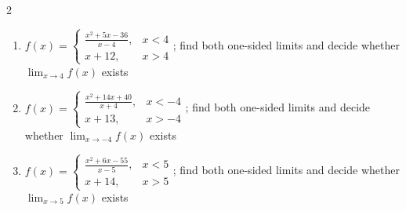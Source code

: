 \documentclass[11pt,oneside]{book}
\begin{document}
\begin{multicols}{2}
\begin{enumerate}[leftmargin=*,label=\textbf{\arabic*.},itemsep=0.65\baselineskip]
\item $f(x)=\begin{cases} \frac{x^{2} + 5 x - 36}{x - 4}, & x<4\\ x + 12, & x>4 \end{cases}$; find both one-sided limits and decide whether $\lim_{x\to 4}f(x)$ exists
\item $f(x)=\begin{cases} \frac{x^{2} + 14 x + 40}{x + 4}, & x<-4\\ x + 13, & x>-4 \end{cases}$; find both one-sided limits and decide whether $\lim_{x\to -4}f(x)$ exists
\item $f(x)=\begin{cases} \frac{x^{2} + 6 x - 55}{x - 5}, & x<5\\ x + 14, & x>5 \end{cases}$; find both one-sided limits and decide whether $\lim_{x\to 5}f(x)$ exists
\end{enumerate}
\end{multicols}
\end{document}

